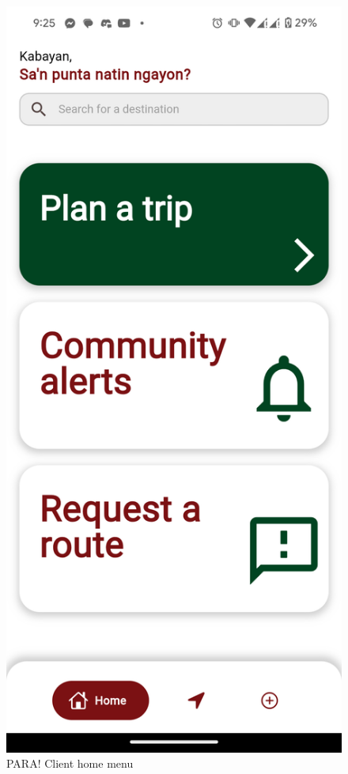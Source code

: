 \documentclass[journal]{./IEEE/IEEEtran}
\begin{document}
\begin{description}
\begin{figure}[!h]
    \centering
        \includegraphics[scale=0.1]{./figures/client/home menu.png}
    \caption{PARA! Client home menu}
\end{figure}

\end{description}
\end{document}
